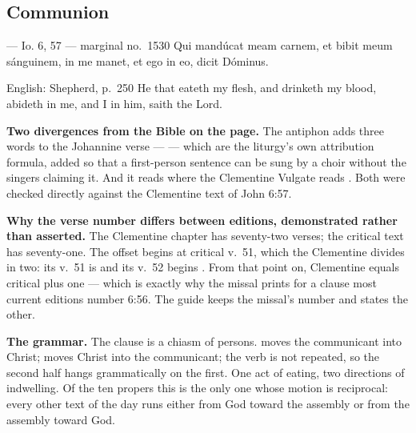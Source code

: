 \subsection*{Communion }

\begin{appointedlatin}{ --- Io. 6, 57 --- marginal no.\ 1530}
Qui mandúcat meam carnem, et bibit meum sánguinem, in me manet, et ego in eo,
dicit Dóminus.
\end{appointedlatin}

\begin{namedtranslation}{English: Shepherd, p.~250}
He that eateth my flesh, and drinketh my blood, abideth in me, and I in him,
saith the Lord.
\end{namedtranslation}

\textbf{Two divergences from the Bible on the page.} The antiphon adds three
words to the Johannine verse ---  --- which are the
liturgy's own attribution formula, added so that a first-person sentence can
be sung by a choir without the singers claiming it. And it reads  where the Clementine Vulgate reads . Both were
checked directly against the Clementine text of John 6:57.

\textbf{Why the verse number differs between editions, demonstrated rather
than asserted.} The Clementine chapter has seventy-two verses; the critical
text has seventy-one. The offset begins at critical v.~51, which the Clementine
divides in two: its v.~51 is  and its v.~52 begins . From
that point on, Clementine equals critical plus one --- which is exactly why the
missal prints  for a clause most current editions number
6:56. The guide keeps the missal's number and states the other.

\textbf{The grammar.} The clause is a chiasm of persons. 
moves the communicant into Christ;  moves Christ into the
communicant; the verb is not repeated, so the second half hangs grammatically
on the first. One act of eating, two directions of indwelling. Of the ten
propers this is the only one whose motion is reciprocal: every other text of
the day runs either from God toward the assembly or from the assembly toward
God.

